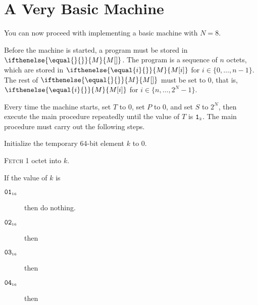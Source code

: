 \documentclass[a4paper,12pt]{article}
\newcommand{\num}[1]{\texttt{#1}}
\newcommand{\hex}[1]{\num{#1}_{\textup{\tiny 16}}}
\newcommand{\bin}[1]{\num{#1}_{\textup{\tiny 2}}}
\newcommand{\MEM}[1]{\ifthenelse{\equal{#1}{}}{M}{M[#1]}}
\newcommand{\PC}{P}
\newcommand{\SP}{S}
\newcommand{\TERM}{T}
\newcommand{\T}{\bin{1}}
\newcommand{\range}[2]{\{#1,\ldots,#2\}}
\newcommand{\proc}[1]{\textsc{#1}}
\newcommand{\op}[1]{$#1$}
\newcommand{\NOP}       [1]{\op{\hex{01}}}
\newcommand{\JUMP}      [1]{\op{\hex{02}}}
\newcommand{\JUMPZERO}  [1]{\op{\hex{03}}}
\newcommand{\SETSP}     [1]{\op{\hex{04}}}
\begin{document}
\section{A Very Basic Machine}

You can now proceed with implementing a basic machine with $N=8$.

Before the machine is started, a program must be stored in $\MEM{}$.
The program is a sequence of $n$ octets, which are stored in $\MEM{i}$ for $i \in \range{0}{n-1}$.
The rest of $\MEM{}$ must be set to 0, that is, $\MEM{i}$ for $i \in \range{n}{2^N-1}$.

Every time the machine starts, set $\TERM$ to 0, set $\PC$ to $0$, and set $\SP$ to $2^N$, then execute the main procedure repeatedly until the value of $\TERM$ is $\T$.
The main procedure must carry out the following steps.
\begin{stepnumbers}
\item Initialize the temporary 64-bit element $k$ to 0.
\item \proc{Fetch} 1 octet into $k$.
\item\label{itm:main-case} If the value of $k$ is
  \begin{description}
  \item[\NOP{}] then do nothing.
  \item[\JUMP{}] then
  \item[\JUMPZERO{}] then
  \item[\SETSP{}] then
\end{description}
\end{stepnumbers}
\end{document}
